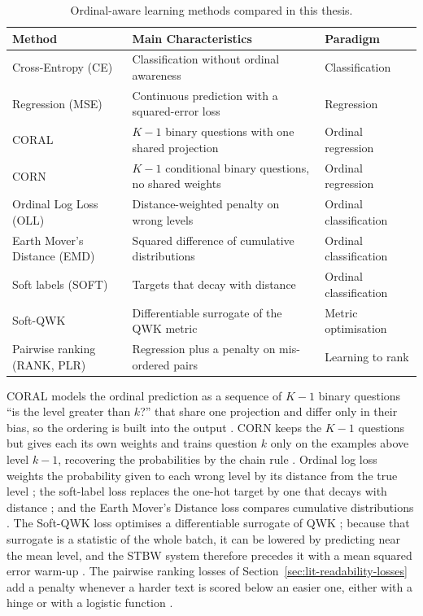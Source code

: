 \begin{table}[H]
\centering
\footnotesize
\caption{Ordinal-aware learning methods compared in this thesis.}
\label{tab:ordinal_methods}
\begin{tabular}{p{3.2cm} p{5.8cm} p{2.4cm}}
\toprule
\textbf{Method} & \textbf{Main Characteristics} & \textbf{Paradigm} \\
\midrule
Cross-Entropy (CE) & Classification without ordinal awareness & Classification \\
Regression (MSE) & Continuous prediction with a squared-error loss & Regression \\
CORAL & $K{-}1$ binary questions with one shared projection & Ordinal regression \\
CORN & $K{-}1$ conditional binary questions, no shared weights & Ordinal regression \\
Ordinal Log Loss (OLL) & Distance-weighted penalty on wrong levels & Ordinal classification \\
Earth Mover's Distance (EMD) & Squared difference of cumulative distributions & Ordinal
classification \\
Soft labels (SOFT) & Targets that decay with distance & Ordinal classification \\
Soft-QWK & Differentiable surrogate of the QWK metric & Metric optimisation \\
Pairwise ranking (RANK, PLR) & Regression plus a penalty on mis-ordered pairs & Learning to rank
\\
\bottomrule
\end{tabular}
\end{table}

CORAL models the ordinal prediction as a sequence of $K{-}1$ binary questions ``is the level
greater than $k$?'' that share one projection and differ only in their bias, so the ordering is
built into the output \cite{cao2020coral}. CORN keeps the $K{-}1$ questions but gives each its own
weights and trains question $k$ only on the examples above level $k-1$, recovering the
probabilities by the chain rule \cite{shi2023corn}. Ordinal log loss weights the probability
given to each wrong level by its distance from the true level \cite{castagnos2022ordinal}; the
soft-label loss replaces the one-hot target by one that decays with distance
\cite{bertinetto2020soft}; and the Earth Mover's Distance loss compares cumulative distributions
\cite{hou2017emd}. The Soft-QWK loss optimises a differentiable surrogate of QWK
\cite{delatorre2018wkl,diaz2019softlabels}; because that surrogate is a statistic of the whole
batch, it can be lowered by predicting near the mean level, and the STBW system therefore
precedes it with a mean squared error warm-up \cite{trigui2025stbw}. The pairwise ranking losses
of Section~\ref{sec:lit-readability-losses} add a penalty whenever a harder text is scored below
an easier one, either with a hinge \cite{trokhymovych2024readability} or with a logistic function
\cite{lee2022neural,burges2005learning}.

